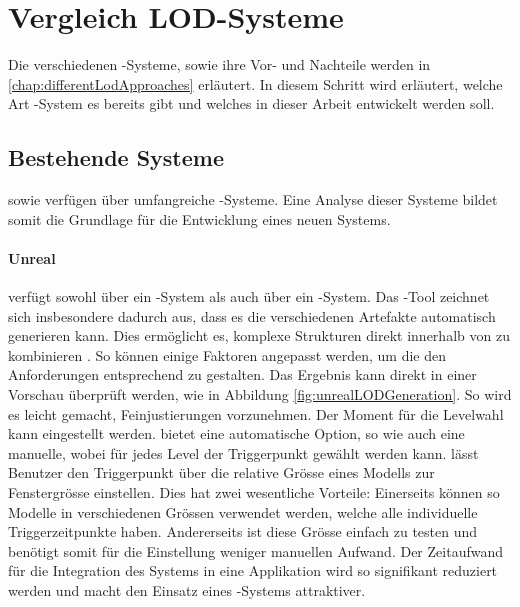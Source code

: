 \section{Vergleich LOD-Systeme}
Die verschiedenen -Systeme, sowie ihre Vor- und Nachteile werden in \autoref{chap:differentLodApproaches} erläutert. In diesem Schritt wird erläutert, welche Art -System es bereits gibt und welches in dieser Arbeit entwickelt werden soll.

\subsection{Bestehende Systeme}
\label{chap:existingSolutions}

 sowie  verfügen über umfangreiche -Systeme. Eine Analyse dieser Systeme bildet somit die Grundlage für die Entwicklung eines neuen Systems.

\paragraph{Unreal}

 verfügt sowohl über ein -System als auch über ein -System. Das -Tool zeichnet sich insbesondere dadurch aus, dass es die verschiedenen Artefakte automatisch generieren kann. Dies ermöglicht es, komplexe Strukturen direkt innerhalb von  zu kombinieren \cite{unrealProxyLod}.
So können einige Faktoren angepasst werden, um die  den Anforderungen entsprechend zu gestalten. Das Ergebnis kann direkt in einer Vorschau überprüft werden, wie in Abbildung \ref{fig:unrealLODGeneration}. So wird es leicht gemacht, Feinjustierungen vorzunehmen.
Der Moment für die Levelwahl kann eingestellt werden.  bietet eine automatische Option, so wie auch eine manuelle, wobei für jedes Level der Triggerpunkt gewählt werden kann.
 lässt Benutzer den Triggerpunkt über die relative Grösse eines Modells zur Fenstergrösse einstellen. Dies hat zwei wesentliche Vorteile: Einerseits können so Modelle in verschiedenen Grössen verwendet werden, welche alle individuelle Triggerzeitpunkte haben. Andererseits ist diese Grösse einfach zu testen und benötigt somit für die Einstellung weniger manuellen Aufwand.
Der Zeitaufwand für die Integration des Systems in eine Applikation wird so signifikant reduziert werden und macht den Einsatz eines -Systems attraktiver.

